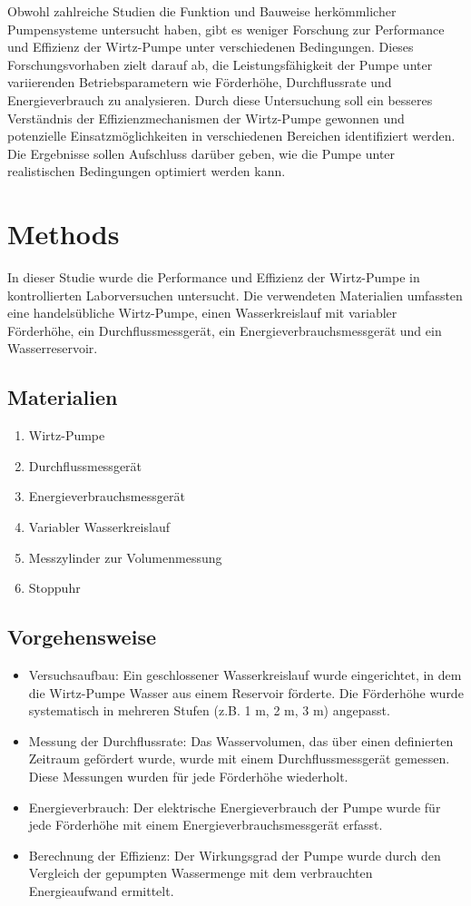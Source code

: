 \documentclass[12pt]{article}
\begin{document}
Obwohl zahlreiche Studien die Funktion und Bauweise herkömmlicher Pumpensysteme untersucht haben, gibt es weniger Forschung zur Performance und Effizienz der Wirtz-Pumpe unter verschiedenen Bedingungen. Dieses Forschungsvorhaben zielt darauf ab, die Leistungsfähigkeit der Pumpe unter variierenden Betriebsparametern wie Förderhöhe, Durchflussrate und Energieverbrauch zu analysieren. Durch diese Untersuchung soll ein besseres Verständnis der Effizienzmechanismen der Wirtz-Pumpe gewonnen und potenzielle Einsatzmöglichkeiten in verschiedenen Bereichen identifiziert werden. Die Ergebnisse sollen Aufschluss darüber geben, wie die Pumpe unter realistischen Bedingungen optimiert werden kann.

\section{Methods}
In dieser Studie wurde die Performance und Effizienz der Wirtz-Pumpe in kontrollierten Laborversuchen untersucht. Die verwendeten Materialien umfassten eine handelsübliche Wirtz-Pumpe, einen Wasserkreislauf mit variabler Förderhöhe, ein Durchflussmessgerät, ein Energieverbrauchsmessgerät und ein Wasserreservoir.

\subsection{Materialien}
\begin{enumerate}
\item Wirtz-Pumpe
\item Durchflussmessgerät
\item Energieverbrauchsmessgerät
\item Variabler Wasserkreislauf
\item Messzylinder zur Volumenmessung
\item Stoppuhr
\end{enumerate}

\subsection{Vorgehensweise}
\begin{itemize}
\item Versuchsaufbau: Ein geschlossener Wasserkreislauf wurde eingerichtet, in dem die Wirtz-Pumpe Wasser aus einem Reservoir förderte. Die Förderhöhe wurde systematisch in mehreren Stufen (z.B. 1 m, 2 m, 3 m) angepasst.
\item Messung der Durchflussrate: Das Wasservolumen, das über einen definierten Zeitraum gefördert wurde, wurde mit einem Durchflussmessgerät gemessen. Diese Messungen wurden für jede Förderhöhe wiederholt.
\item Energieverbrauch: Der elektrische Energieverbrauch der Pumpe wurde für jede Förderhöhe mit einem Energieverbrauchsmessgerät erfasst.
\item Berechnung der Effizienz: Der Wirkungsgrad der Pumpe wurde durch den Vergleich der gepumpten Wassermenge mit dem verbrauchten Energieaufwand ermittelt.
\end{itemize}
\end{document}
